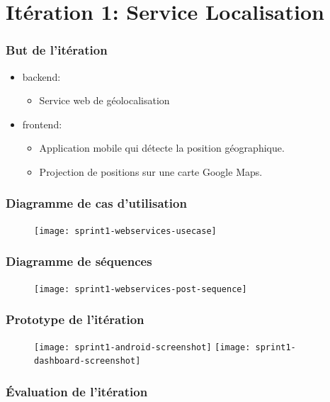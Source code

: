 \documentclass{beamer}
\begin{document}
\section{Itération 1: Service Localisation}

\begin{frame}
    \frametitle{But de l'itération}
    \begin{itemize}
        \item backend:
        \begin{itemize}
        \item Service web de géolocalisation
        \end{itemize}
    \item frontend:
        \begin{itemize}
        \item Application mobile qui détecte la position géographique.
        \item Projection de positions sur une carte Google Maps.
    \end{itemize}
    \end{itemize}
\end{frame}

\begin{frame}
    \frametitle{Diagramme de cas d'utilisation}
    \begin{figure}
        \texttt{[image: sprint1-webservices-usecase]}
    \end{figure}
\end{frame}

\begin{frame}
    \frametitle{Diagramme de séquences}
    \begin{figure}
        \texttt{[image: sprint1-webservices-post-sequence]}
    \end{figure}
\end{frame}

\begin{frame}
    \frametitle{Prototype de l'itération}
    \begin{figure}
        \texttt{[image: sprint1-android-screenshot]}
        \texttt{[image: sprint1-dashboard-screenshot]}
    \end{figure}
\end{frame}

\begin{frame}
\frametitle{Évaluation de l'itération}
\begin{minipage}{\textwidth}

\end{minipage}
\end{frame}
\end{document}
